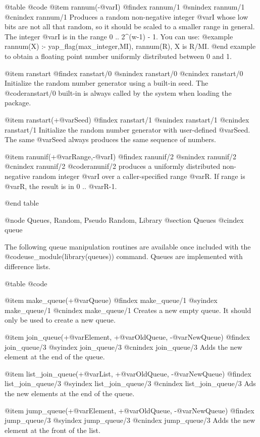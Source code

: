 @table @code 
@item rannum(-@var{I})
@findex rannum/1
@snindex rannum/1
@cnindex rannum/1
Produces a random non-negative integer @var{I} whose low bits are not
all that random, so it should be scaled to a smaller range in general.
The integer @var{I} is in the range 0 .. 2^(w-1) - 1. You can use:
@example
rannum(X) :- yap_flag(max_integer,MI), rannum(R), X is R/MI.
@end example
to obtain a floating point number uniformly distributed between 0 and 1.

@item ranstart
@findex ranstart/0
@snindex ranstart/0
@cnindex ranstart/0
Initialize the random number generator using a built-in seed. The
@code{ranstart/0} built-in is always called by the system when loading
the package.

@item ranstart(+@var{Seed})
@findex ranstart/1
@snindex ranstart/1
@cnindex ranstart/1
Initialize the random number generator with user-defined @var{Seed}. The
same @var{Seed} always produces the same sequence of numbers.

@item ranunif(+@var{Range},-@var{I})
@findex ranunif/2
@snindex ranunif/2
@cnindex ranunif/2
@code{ranunif/2} produces a uniformly distributed non-negative random
integer @var{I} over a caller-specified range @var{R}.  If range is @var{R},
the result is in 0 .. @var{R}-1.

@end table

@node Queues, Random, Pseudo Random, Library
@section Queues
@cindex queue

The following queue manipulation routines are available once
included with the @code{use_module(library(queues))} command. Queues are
implemented with difference lists.

@table @code

@item make_queue(+@var{Queue})
@findex make_queue/1
@syindex make_queue/1
@cnindex make_queue/1
Creates a new empty queue. It should only be used to create a new queue.

@item join_queue(+@var{Element}, +@var{OldQueue}, -@var{NewQueue})
@findex join_queue/3
@syindex join_queue/3
@cnindex join_queue/3
Adds the new element at the end of the queue.

@item list_join_queue(+@var{List}, +@var{OldQueue}, -@var{NewQueue})
@findex list_join_queue/3
@syindex list_join_queue/3
@cnindex list_join_queue/3
Ads the new elements at the end of the queue.

@item jump_queue(+@var{Element}, +@var{OldQueue}, -@var{NewQueue})
@findex jump_queue/3
@syindex jump_queue/3
@cnindex jump_queue/3
Adds the new element at the front of the list.

